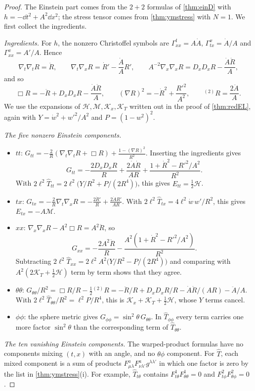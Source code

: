 \begin{proof}
The Einstein part comes from the $2+2$ formulas of \cref{thm:einD} with $h=-\dd t^2+A^2\dd x^2$; the stress tensor comes from \cref{thm:ymstress} with $N=1$. We first collect the ingredients.

\emph{Ingredients.} For $h$, the nonzero Christoffel symbols are $\Gamma^t_{xx}=A\dot A$, $\Gamma^x_{tx}=\dot A/A$ and $\Gamma^x_{xx}=A'/A$. Hence
\[
\nabla_t\nabla_tR=\ddot R,\qquad\nabla_t\nabla_xR=\dot R'-\frac{\dot A}AR',\qquad A^{-2}\nabla_x\nabla_xR=D_xD_xR-\frac{\dot A\dot R}A ,
\]
and so
\[
\Box R=-\ddot R+D_xD_xR-\frac{\dot A\dot R}A,\qquad(\nabla R)^2=-\dot R^2+\frac{R'^2}{A^2},\qquad{}^{(2)}\!R=\frac{2\ddot A}A .
\]
We use the expansions of $\mathcal H,\mathcal M,\mathcal K_x,\mathcal K_T$ written out in the proof of \cref{thm:redEL}, again with $Y=\dot w^2+w'^2/A^2$ and $P=(1-w^2)^2$.

\emph{The five nonzero Einstein components.}
\begin{itemize}
\item $tt$: $G_{tt}=-\frac2R(\nabla_t\nabla_tR+\Box R)+\frac{1-(\nabla R)^2}{R^2}$. Inserting the ingredients gives
\[
G_{tt}=-\frac{2D_xD_xR}R+\frac{2\dot A\dot R}{AR}+\frac{1+\dot R^2-R'^2/A^2}{R^2}.
\]
With $2\ell^2\hat T_{tt}=2\ell^2\bigl(Y/R^2+P/(2R^4)\bigr)$, this gives $E_{tt}=\frac12\mathcal H$.
\item $tx$: $G_{tx}=-\frac2R\nabla_t\nabla_xR=-\frac{2\dot R'}R+\frac{2\dot AR'}{AR}$. With $2\ell^2\hat T_{tx}=4\ell^2\dot w\,w'/R^2$, this gives $E_{tx}=-A\mathcal M$.
\item $xx$: $\nabla_x\nabla_xR-A^2\Box R=A^2\ddot R$, so
\[
G_{xx}=-\frac{2A^2\ddot R}R-\frac{A^2(1+\dot R^2-R'^2/A^2)}{R^2}.
\]
Subtracting $2\ell^2\hat T_{xx}=2\ell^2A^2\bigl(Y/R^2-P/(2R^4)\bigr)$ and comparing with $A^2(2\mathcal K_T+\frac12\mathcal H)$ term by term shows that they agree.
\item $\theta\theta$: $G_{\theta\theta}/R^2=\Box R/R-\frac12{}^{(2)}\!R=-\ddot R/R+D_xD_xR/R-\dot A\dot R/(AR)-\ddot A/A$. With $2\ell^2\hat T_{\theta\theta}/R^2=\ell^2P/R^4$, this is $\mathcal K_x+\mathcal K_T+\frac12\mathcal H$, whose $Y$ terms cancel.
\item $\phi\phi$: the sphere metric gives $G_{\phi\phi}=\sin^2\theta\,G_{\theta\theta}$. In $\hat T_{\phi\phi}$ every term carries one more factor $\sin^2\theta$ than the corresponding term of $\hat T_{\theta\theta}$.
\end{itemize}

\emph{The ten vanishing Einstein components.} The warped-product formulas have no components mixing $(t,x)$ with an angle, and no $\theta\phi$ component. For $\hat T$, each mixed component is a sum of products $F^a_{\mu\lambda}F^a_{\nu\lambda'}g^{\lambda\lambda'}$ in which one factor is zero by the list in \cref{thm:ymstress}(i). For example, $\hat T_{t\theta}$ contains $F^1_{t\theta}F^1_{\theta\theta}=0$ and $F^2_{t\phi}F^2_{\theta\phi}=0$.


\end{proof}
